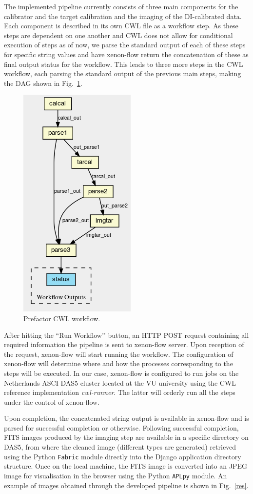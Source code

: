 \documentclass[conference]{IEEEtran}
\newcommand{\tit}[1]{\textit{#1}}
\newcommand{\thi}[1]{\texttt{#1}}
\begin{document}
The implemented pipeline currently consists of three main components for the calibrator and the target calibration and the imaging of the DI-calibrated data. Each component is described in its own CWL file as a workflow step. As these steps are dependent on one another and CWL does not allow for conditional execution of steps as of now, we parse the standard output of each of these steps for specific string values and have xenon-flow return the concatenation of these as final output status for the workflow. This leads to three more steps in the CWL workflow, each parsing the standard output of the previous main steps, making the DAG shown in Fig.~\ref{cwl}.

\begin{figure}[htbp]
    \centerline{\includegraphics[trim=0 0 0 1cm clip=true,height=.3\textwidth]{cwlgraph}}
    \caption{Prefactor CWL workflow.}
    \label{cwl}
\end{figure}


 After hitting the ``Run Workflow’’ button, an HTTP POST request containing all required information the pipeline is sent to xenon-flow server. Upon reception of the request, xenon-flow will start running the workflow. The configuration of xenon-flow will determine where and how the processes corresponding to the steps will be executed. In our case, xenon-flow is configured to run jobs on the Netherlands ASCI DAS5 cluster located at the VU university using the CWL reference implementation \tit{cwl-runner}. The latter will orderly run all the steps under the control of xenon-flow.

 Upon completion, the concatenated string output is available in xenon-flow and is parsed for successful completion or otherwise. Following successful completion, FITS images produced by the imaging step are available in a specific directory on DAS5, from where the cleaned image (different types are generated) retrieved using the Python \thi{Fabric} module directly into the Django application directory structure. Once on the local machine, the FITS image is converted into an JPEG image for visualisation in the browser using the Python \thi{APLpy} module. An example of images obtained through the developed pipeline is shown in Fig.~\ref{res}.
\end{document}
